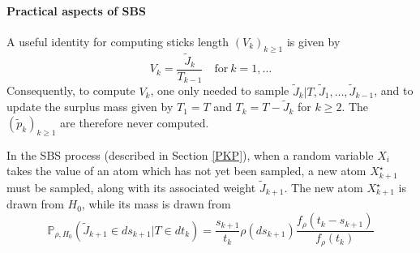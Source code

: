 
\paragraph{Practical aspects of \gls{SBS}}
A useful identity for computing sticks length $(V_k)_{k \ge 1}$ is given by
\begin{equation} \label{eq:SBS4}
V_k = \frac{\tilde{J}_k}{T_{k-1}} \quad \text{for} \ k=1,\dots
\end{equation}
Consequently, to compute $V_k$, one only needed to sample $\tilde{J}_{k}|T,\tilde{J}_1,\dots,\tilde{J}_{k-1}$, and to update the surplus mass given by $T_1 = T$ and $T_k = T - \tilde{J}_k$ for $k \ge 2$.
The $(\tilde{p}_k)_{k \ge 1}$ are therefore never computed.

In the \acrlong{SBS} process (described in Section \ref{PKP}), when a random variable $X_i$ takes the value of an atom which has not yet been sampled, a new atom $X^\star_{k+1}$ must be sampled, along with its associated weight $\tilde{J}_{k+1}$. The new atom $X_{k+1}^\star$ is drawn from $H_0$, while its mass is drawn from
\begin{equation} \label{eq:SBS3}
\mathbb{P}_{\rho,H_0}(\tilde{J}_{k+1} \in ds_{k+1} | T \in dt_k) = \frac{s_{k+1}}{t_k}\rho(ds_{k+1})\frac{f_\rho(t_k - s_{k+1})}{f_\rho(t_k)}
\end{equation}


